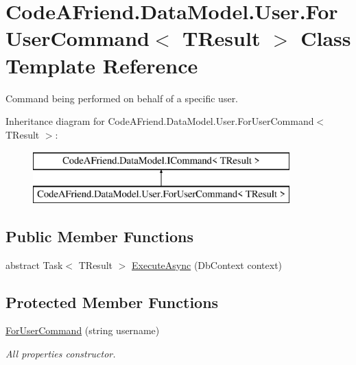 \hypertarget{class_code_a_friend_1_1_data_model_1_1_user_1_1_for_user_command}{}\section{Code\+A\+Friend.\+Data\+Model.\+User.\+For\+User\+Command$<$ T\+Result $>$ Class Template Reference}
\label{class_code_a_friend_1_1_data_model_1_1_user_1_1_for_user_command}


Command being performed on behalf of a specific user. 


Inheritance diagram for Code\+A\+Friend.\+Data\+Model.\+User.\+For\+User\+Command$<$ T\+Result $>$\+:\begin{figure}[H]
\begin{center}
\leavevmode
\includegraphics[height=2.000000cm]{class_code_a_friend_1_1_data_model_1_1_user_1_1_for_user_command}
\end{center}
\end{figure}
\subsection*{Public Member Functions}
\begin{DoxyCompactItemize}
\item 
abstract Task$<$ T\+Result $>$ \mbox{\hyperlink{class_code_a_friend_1_1_data_model_1_1_user_1_1_for_user_command_aa9abf9da11dd2a573d8ed93bcf53f6df}{Execute\+Async}} (Db\+Context context)
\end{DoxyCompactItemize}
\subsection*{Protected Member Functions}
\begin{DoxyCompactItemize}
\item 
\mbox{\hyperlink{class_code_a_friend_1_1_data_model_1_1_user_1_1_for_user_command_ae8e4225f2733cef42a531d4a30ba1b3e}{For\+User\+Command}} (string username)
\begin{DoxyCompactList}\small\item\em All properties constructor.\end{DoxyCompactList}\end{DoxyCompactItemize}
